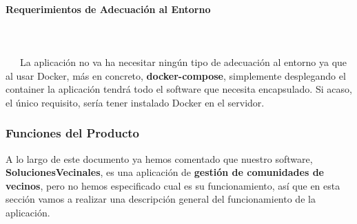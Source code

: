 \paragraph{Requerimientos de Adecuación al Entorno}
~\\\\
\-\ \-\ \-\ La aplicación no va ha necesitar ningún tipo de adecuación al entorno ya que al usar Docker, más en concreto, \textbf{docker-compose}, simplemente desplegando el container la aplicación tendrá todo el software que necesita encapsulado. Si acaso, el único requisito, sería tener instalado Docker en el servidor.

\subsubsection{Funciones del Producto}
A lo largo de este documento ya hemos comentado que nuestro software, \textbf{SolucionesVecinales}, es una aplicación de \textbf{gestión de comunidades de vecinos}, pero no hemos especificado cual es su funcionamiento, así que en esta sección vamos a realizar una descripción general del funcionamiento de la aplicación.

